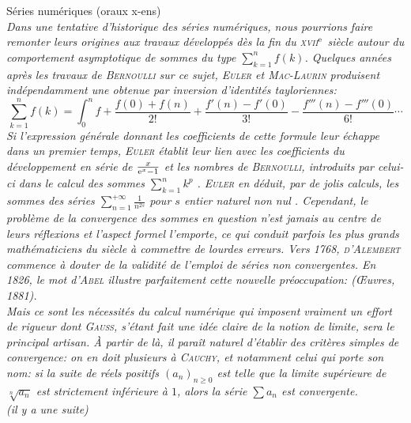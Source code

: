 Séries numériques (oraux x-ens)\\
\textsl{
Dans une tentative d'historique des séries numériques, nous pourrions faire remonter leurs origines aux travaux développés dès la fin du \textsc{xvii}$^{\mathrm{e}}$ siècle autour du comportement asymptotique de sommes du type $\sum\limits_{k=1}^n f(k)$. Quelques années après les travaux de \textsc{Bernoulli} sur ce sujet, \textsc{Euler} et \textsc{Mac-Laurin} produisent indépendamment une  obtenue par inversion d'identités tayloriennes:
$$\sum_{k=1}^n f(k) = \int_0^n f + \frac{f(0) + f(n)}{2!} + \frac{f'(n) - f'(0)}{3!} - \frac{f'''(n) - f'''(0)}{6!}\cdots$$
Si l'expression générale donnant les coefficients de cette formule leur échappe dans un premier temps, \textsc{Euler} établit leur lien avec les coefficients du développement en série de $\frac{x}{\mathrm{e}^x-1}$ et les nombres de \textsc{Bernoulli}, introduits par celui-ci dans le calcul des sommes $\sum\limits_{k=1}^n k^p$ \note. \textsc{Euler} en déduit, par de jolis calculs, les sommes des séries $\sum\limits_{n=1}^{+\infty} \frac{1}{n^{2s}}$ pour $s$ entier naturel non nul \note.
Cependant, le problème de la convergence des sommes en question n'est jamais au centre de leurs réflexions et l'aspect formel l'emporte, ce qui conduit parfois les plus grands mathématiciens du siècle à commettre de lourdes erreurs. Vers 1768, \textsc{d'Alembert} commence à douter de la validité de l'emploi de séries non convergentes. En 1826, le mot d'\textsc{Abel} illustre parfaitement cette nouvelle préoccupation:  (Œuvres, 1881). \\
Mais ce sont les nécessités du calcul numérique qui imposent vraiment un effort de rigueur dont \textsc{Gauss}, s'étant fait une idée claire de la notion de limite, sera le principal artisan. À partir de là, il paraît naturel d'établir des critères simples de convergence: on en doit plusieurs à \textsc{Cauchy}, et notamment celui qui porte son nom: si la suite de réels positifs $(a_n)_{n \geqslant 0}$ est telle que la limite supérieure de $\sqrt[n]{a_n}$ est strictement inférieure à $1$, alors la série $\sum a_n$ est convergente. \\
(il y a une suite)
}